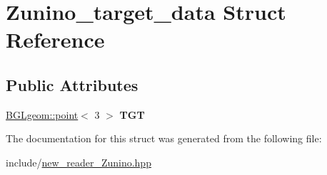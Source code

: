 \hypertarget{structZunino__target__data}{
\section{Zunino\_\-target\_\-data Struct Reference}
\label{structZunino__target__data}
}
\subsection*{Public Attributes}
\begin{DoxyCompactItemize}
\item 
\hypertarget{structZunino__target__data_a4c43a30f956f9cd43b94a84b856819ac}{
\hyperlink{classBGLgeom_1_1point}{BGLgeom::point}$<$ 3 $>$ {\bfseries TGT}}
\label{structZunino__target__data_a4c43a30f956f9cd43b94a84b856819ac}

\end{DoxyCompactItemize}


The documentation for this struct was generated from the following file:\begin{DoxyCompactItemize}
\item 
include/\hyperlink{new__reader__Zunino_8hpp}{new\_\-reader\_\-Zunino.hpp}\end{DoxyCompactItemize}

